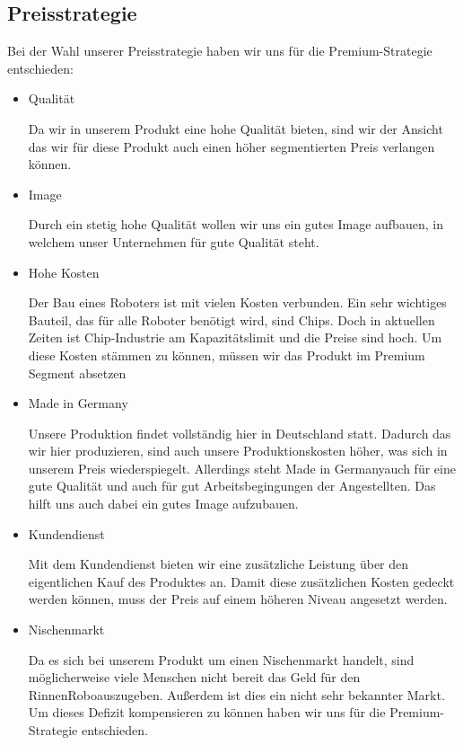 \subsection{Preisstrategie} \label{preisstrat}
    Bei der Wahl unserer Preisstrategie haben wir uns für die Premium-Strategie entschieden:
    
        \begin{itemize}
            \item Qualität
            
                Da wir in unserem Produkt eine hohe Qualität bieten, sind wir der Ansicht das wir für diese Produkt auch
                einen höher segmentierten Preis verlangen können.

            \item Image
            
                Durch ein stetig hohe Qualität wollen wir uns ein gutes Image aufbauen, in welchem unser Unternehmen für
                gute Qualität steht.

            \item Hohe Kosten

                Der Bau eines Roboters ist mit vielen Kosten verbunden. Ein sehr wichtiges Bauteil, das für alle Roboter
                benötigt wird, sind Chips. Doch in aktuellen Zeiten ist Chip-Industrie am Kapazitätslimit und die Preise
                sind hoch. Um diese Kosten stämmen zu können, müssen wir das Produkt im Premium Segment absetzen

            \item Made in Germany
            
                Unsere Produktion findet vollständig hier in Deutschland statt. Dadurch das wir hier produzieren, sind
                auch unsere Produktionskosten höher, was sich in unserem Preis wiederspiegelt. Allerdings steht \as Made
                in Germany\adl auch für eine gute Qualität und auch für gut Arbeitsbegingungen der Angestellten. Das
                hilft uns auch dabei ein gutes Image aufzubauen.

            \item Kundendienst
            
                Mit dem Kundendienst bieten wir eine zusätzliche Leistung über den eigentlichen Kauf des Produktes
                an. Damit diese zusätzlichen Kosten gedeckt werden können, muss der Preis auf einem höheren Niveau 
                angesetzt werden.

            \item Nischenmarkt
            
                Da es sich bei unserem Produkt um einen Nischenmarkt handelt, sind möglicherweise viele Menschen nicht 
                bereit das Geld für den \as RinnenRobo\adl auszugeben. Außerdem ist dies ein nicht sehr bekannter Markt.
                Um dieses Defizit kompensieren zu können haben wir uns für die Premium-Strategie entschieden.
        \end{itemize}

